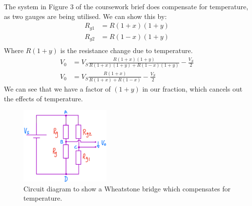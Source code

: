 \documentclass[12pt]{article}
\numberwithin{equation}{section}
\begin{document}
The system in Figure 3 of the coursework brief does compensate for temperature, as two gauges are being utilised. We can show this by:
\begin{align}
  R_{g1} &= R(1+x)(1+y)\\
  R_{g2} &= R(1-x)(1+y)\\
\end{align}
Where $R(1+y)$ is the resistance change due to temperature.
\begin{align}
  V_0 &= V_S \frac{R(1+x)(1+y)}{R(1+x)(1+y) + R(1-x)(1+y)} - \frac{V_S}{2}\\
  V_0 &= V_S \frac{R(1+x)}{R(1+x) + R(1-x)} - \frac{V_S}{2}
\end{align}
We can see that we have a factor of $(1+y)$ in our fraction, which cancels out the effects of temperature.
\begin{figure}[H]
  \centering
  \includegraphics[width=0.4\textwidth]{./img/4-1circuit.png}
  \caption{Circuit diagram to show a Wheatstone bridge which compensates for temperature.}
\end{figure}
\end{document}
